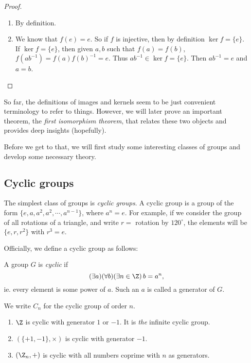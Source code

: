 \documentclass[a4paper]{article}
\begin{document}
\begin{proof}\leavevmode
  \begin{enumerate}
    \item By definition.
    \item We know that $f(e) = e$. So if $f$ is injective, then by definition $\ker f = \{e\}$. If $\ker f = \{e\}$, then given $a, b$ such that $f(a) = f(b)$, $f(ab^{-1}) = f(a)f(b)^{-1} = e$. Thus $ab^{-1}\in \ker f = \{e\}$.  Then $ab^{-1} = e$ and $a = b$.
  \end{enumerate}
\end{proof}

So far, the definitions of images and kernels seem to be just convenient terminology to refer to things. However, we will later prove an important theorem, the \emph{first isomorphism theorem}, that relates these two objects and provides deep insights (hopefully).

Before we get to that, we will first study some interesting classes of groups and develop some necessary theory.

\subsection{Cyclic groups}
The simplest class of groups is \emph{cyclic groups}. A cyclic group is a group of the form $\{e, a, a^2, a^2, \cdots, a^{n - 1}\}$, where $a^n = e$. For example, if we consider the group of all rotations of a triangle, and write $r = $ rotation by $120^\circ$, the elements will be $\{e, r, r^2\}$ with $r^3 = e$.

Officially, we define a cyclic group as follows:
\begin{defi}
  A group $G$ is \emph{cyclic} if
  \[
    (\exists a)(\forall b)(\exists n\in\Z)\, b = a^n,
  \]
  ie. every element is some power of $a$. Such an $a$ is called a generator of $G$.

  We write $C_n$ for the cyclic group of order $n$.
\end{defi}

\begin{eg}\leavevmode
  \begin{enumerate}
    \item $\Z$ is cyclic with generator $1$ or $-1$. It is \emph{the} infinite cyclic group.
    \item $(\{+1, -1\}, \times)$ is cyclic with generator $-1$.
    \item $(\Z_n, +)$ is cyclic with all numbers coprime with $n$ as generators.
  \end{enumerate}
\end{eg}
\end{document}
